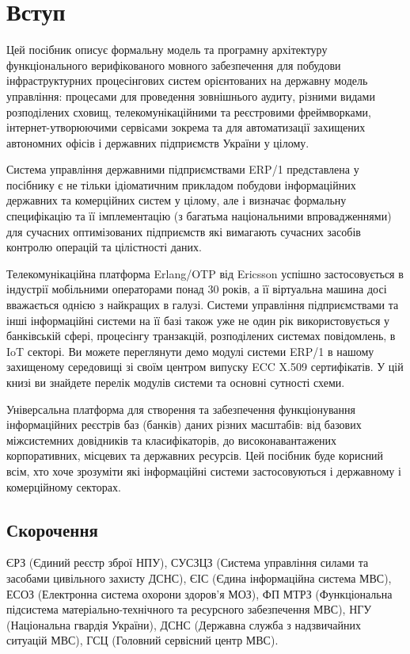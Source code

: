 \chapter{Вступ}

Цей посібник описує формальну модель та програмну архітектуру
функціонального верифікованого мовного забезпечення
для побудови інфраструктурних процесінгових систем
орієнтованих на державну модель управління:
процесами для проведення зовнішнього аудиту,
різними видами розподілених сховищ,
телекомунікаційними та реєстровими фреймворками,
інтернет-утворюючими сервісами зокрема та для
автоматизації захищених автономних офісів і
державних підприємств України у цілому.

Система управління державними підприємствами ERP/1 представлена у
посібнику є не тільки ідіоматичним прикладом побудови інформаційних державних та комерційних систем у цілому,
але і визначає формальну специфікацію та її імплементацію (з багатьма національними впровадженнями)
для сучасних оптимізованих підприємств які вимагають сучасних засобів контролю операцій та цілістності даних.

Телекомунікаційна платформа Erlang/OTP від Ericsson успішно застосовується
в індустрії мобільними операторами понад 30 років, а її віртуальна машина
досі вважається однією з найкращих в галузі. Системи управління підприємствами та інші інформаційні системи
на її базі також уже не один рік використовується у банківській сфері, процесінгу транзакцій,
розподілених системах повідомлень, в IoT секторі. Ви можете переглянути демо
модулі системи ERP/1 в нашому захищеному середовищі зі своїм центром
випуску ECC X.509 сертифікатів. У цій книзі ви знайдете перелік модулів
системи та основні сутності схеми.

Універсальна платформа для створення та забезпечення функціонування
інформаційних реєстрів баз (банків) даних різних масштабів: від базових
міжсистемних довідників та класифікаторів, до високонавантажених корпоративних,
місцевих та державних ресурсів. Цей посібник буде корисний всім,
хто хоче зрозуміти які інформаційні системи застосовуються і
державному і комерційному секторах.

\section*{Скорочення}

ЄРЗ (Єдиний реєстр зброї НПУ),
СУСЗЦЗ (Система управління силами та засобами цивільного захисту ДСНС),
ЄІС (Єдина інформаційна система МВС),
ЕСОЗ (Електронна система охорони здоров'я МОЗ),
ФП МТРЗ (Функціональна підсистема матеріально-технічного та ресурсного забезпечення МВС),
НГУ (Національна гвардія України),
ДСНС (Державна служба з надзвичайних ситуацій МВС),
ГСЦ (Головний сервісний центр МВС).
